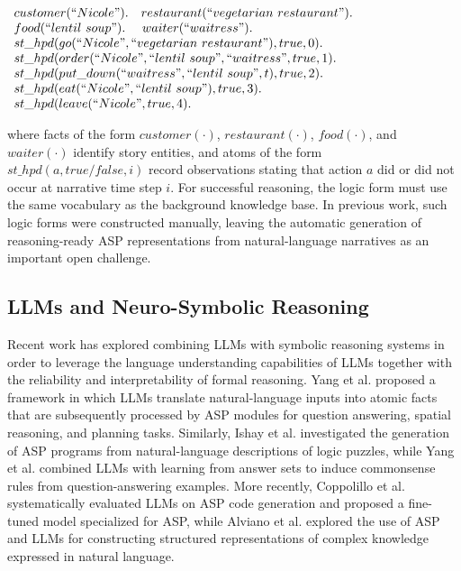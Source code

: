 \documentclass[runningheads]{llncs}
\begin{document}
\smallskip
$
\begin{array} {l}
customer(``Nicole").\ \ \ 
restaurant(``vegetarian\  restaurant").\\
food(``lentil\ soup").\ \ \ \ 
waiter(``waitress").\\
st\_hpd(go(``Nicole", ``vegetarian\  restaurant"), true, 0).\\
st\_hpd(order(``Nicole", ``lentil\  soup", ``waitress", true, 1).\\
st\_hpd(put\_down(``waitress", ``lentil\ soup", t), true, 2).\\
st\_hpd(eat(``Nicole", ``lentil\ soup"), true, 3).\\
st\_hpd(leave(``Nicole", true, 4).
\end{array}
$

\noindent
where facts of the form $customer(\cdot)$, $restaurant(\cdot)$, $food(\cdot)$, and $waiter(\cdot)$ identify story entities, and atoms of the form $st\_hpd(a,\mathit{true}/\mathit{false},i)$ record observations stating that action $a$ did or did not occur at narrative time step $i$.
For successful reasoning, the logic form must use the same vocabulary as the background knowledge base. In previous work, such logic forms were constructed manually, leaving the automatic generation of reasoning-ready ASP representations from natural-language narratives as an important open challenge.


\subsection{LLMs and Neuro-Symbolic Reasoning}

Recent work has explored combining LLMs with symbolic reasoning systems in order to leverage the language understanding capabilities of LLMs together with the reliability and interpretability of formal reasoning. Yang et al. \cite{Yang2023CouplingLL} proposed a framework in which LLMs translate natural-language inputs into atomic facts that are subsequently processed by ASP modules for question answering, spatial reasoning, and planning tasks. Similarly, Ishay et al. \cite{Ishay2023LeveragingLL} investigated the generation of ASP programs from natural-language descriptions of logic puzzles, while Yang et al. \cite{Yang2024LLM2LAS} combined LLMs with learning from answer sets to induce commonsense rules from question-answering examples. More recently, Coppolillo et al. \cite{Coppolillo2024LLASP} systematically evaluated LLMs on ASP code generation and proposed a fine-tuned model specialized for ASP, while Alviano et al. \cite{Alviano2025Integrating} explored the use of ASP and LLMs for constructing structured representations of complex knowledge expressed in natural language.
\end{document}
